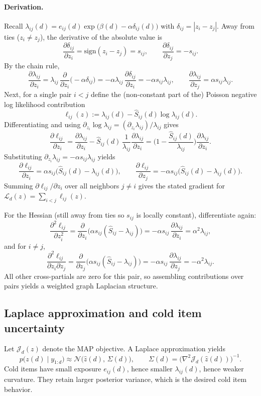 \documentclass[11pt]{article}
\begin{document}
\paragraph{Derivation.}
Recall $\lambda_{ij}(d)=e_{ij}(d)\exp\big(\beta(d)-\alpha\delta_{ij}(d)\big)$ with $\delta_{ij}=|z_i-z_j|$.
Away from ties ($z_i\neq z_j$), the derivative of the absolute value is
\[
\frac{\partial \delta_{ij}}{\partial z_i}=\mathrm{sign}(z_i-z_j)=s_{ij},
\qquad
\frac{\partial \delta_{ij}}{\partial z_j}=-s_{ij}.
\]
By the chain rule,
\[
\frac{\partial \lambda_{ij}}{\partial z_i}
=
\lambda_{ij}\,\frac{\partial}{\partial z_i}\big(-\alpha\delta_{ij}\big)
=
-\alpha\lambda_{ij}\,\frac{\partial\delta_{ij}}{\partial z_i}
=
-\alpha s_{ij}\lambda_{ij},
\qquad
\frac{\partial \lambda_{ij}}{\partial z_j}
=
\alpha s_{ij}\lambda_{ij}.
\]
Next, for a single pair $i<j$ define the (non-constant part of the) Poisson negative log likelihood contribution
\[
\ell_{ij}(z):=\lambda_{ij}(d)-\widehat S_{ij}(d)\log\lambda_{ij}(d).
\]
Differentiating and using $\partial_{z_i}\log\lambda_{ij}=(\partial_{z_i}\lambda_{ij})/\lambda_{ij}$ gives
\[
\frac{\partial \ell_{ij}}{\partial z_i}
=
\frac{\partial \lambda_{ij}}{\partial z_i}
-\widehat S_{ij}(d)\,\frac{1}{\lambda_{ij}}\frac{\partial \lambda_{ij}}{\partial z_i}
=
\Big(1-\frac{\widehat S_{ij}(d)}{\lambda_{ij}}\Big)\frac{\partial \lambda_{ij}}{\partial z_i}.
\]
Substituting $\partial_{z_i}\lambda_{ij}=-\alpha s_{ij}\lambda_{ij}$ yields
\[
\frac{\partial \ell_{ij}}{\partial z_i}
=
\alpha s_{ij}\big(\widehat S_{ij}(d)-\lambda_{ij}(d)\big),
\qquad
\frac{\partial \ell_{ij}}{\partial z_j}
=
-\alpha s_{ij}\big(\widehat S_{ij}(d)-\lambda_{ij}(d)\big).
\]
Summing $\partial \ell_{ij}/\partial z_i$ over all neighbors $j\neq i$ gives the stated gradient for $\mathcal L_d(z)=\sum_{i<j}\ell_{ij}(z)$.

For the Hessian (still away from ties so $s_{ij}$ is locally constant), differentiate again:
\[
\frac{\partial^2 \ell_{ij}}{\partial z_i^2}
=
\frac{\partial}{\partial z_i}\Big(\alpha s_{ij}(\widehat S_{ij}-\lambda_{ij})\Big)
=
-\alpha s_{ij}\,\frac{\partial \lambda_{ij}}{\partial z_i}
=
\alpha^2\lambda_{ij},
\]
and for $i\neq j$,
\[
\frac{\partial^2 \ell_{ij}}{\partial z_i\partial z_j}
=
\frac{\partial}{\partial z_j}\Big(\alpha s_{ij}(\widehat S_{ij}-\lambda_{ij})\Big)
=
-\alpha s_{ij}\,\frac{\partial \lambda_{ij}}{\partial z_j}
=
-\alpha^2\lambda_{ij}.
\]
All other cross-partials are zero for this pair, so assembling contributions over pairs yields a weighted graph Laplacian structure.

\subsection{Laplace approximation and cold item uncertainty}
Let $\mathcal J_d(z)$ denote the MAP objective.
A Laplace approximation yields
\[
p\big(z(d)\mid y_{1:d}\big)\approx \mathcal N\!\big(\widehat z(d),\,\Sigma(d)\big),
\qquad
\Sigma(d)=\Big(\nabla^2 \mathcal J_d(\widehat z(d))\Big)^{-1}.
\]
Cold items have small exposure $e_{ij}(d)$, hence smaller $\lambda_{ij}(d)$, hence weaker curvature.
They retain larger posterior variance, which is the desired cold item behavior.
\end{document}
